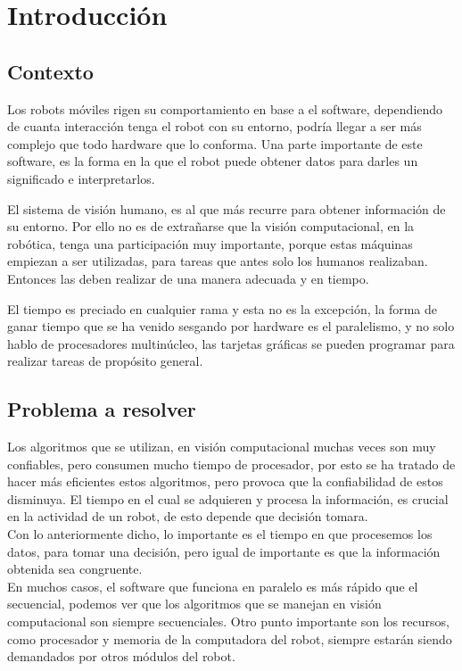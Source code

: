 \chapter{Introducción}

\section{Contexto}
Los robots móviles rigen su comportamiento en base a el software, dependiendo de cuanta interacción tenga el robot con su entorno, podría llegar a ser más complejo que todo hardware que lo conforma. Una parte importante de este software, es la forma en la que el robot puede obtener datos para darles un significado e interpretarlos. 

El sistema de visión humano, es al que más recurre para obtener información de su entorno. Por ello no es de extrañarse que la visión computacional, en la robótica, tenga una participación muy importante, porque estas máquinas empiezan a ser utilizadas, para tareas que antes solo los humanos realizaban. Entonces las deben realizar de una manera adecuada y en tiempo. 

El tiempo es preciado en cualquier rama y esta no es la excepción, la forma de ganar tiempo que se ha venido sesgando por hardware es el paralelismo, y no solo hablo de procesadores multinúcleo, las tarjetas gráficas se pueden programar para realizar tareas de propósito general.   

\pagebreak

\section{Problema a resolver}
Los algoritmos que se utilizan, en visión computacional muchas veces son muy confiables, pero consumen mucho tiempo de procesador, por esto se ha tratado de hacer más eficientes estos algoritmos, pero provoca que  la confiabilidad de estos disminuya. El tiempo en el cual se adquieren y procesa la información, es crucial en la actividad de un robot, de esto depende que decisión tomara.\\

Con lo anteriormente dicho, lo importante es el tiempo en que procesemos los datos, para tomar una decisión, pero igual de importante es que la información obtenida sea congruente. \\

En muchos casos, el software que funciona en paralelo es más rápido que el secuencial, podemos ver que los algoritmos que se manejan en visión computacional son siempre secuenciales. Otro punto importante son los recursos, como procesador y memoria de la computadora del robot, siempre estarán siendo demandados por otros módulos del robot.    \\

